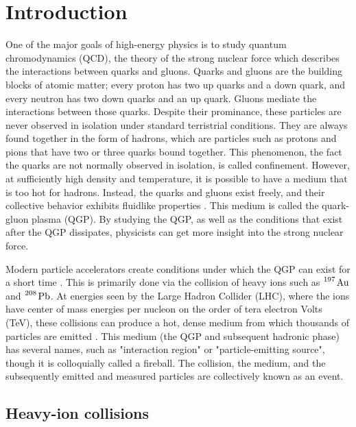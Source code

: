 \chapter{Introduction}
\label{sec:Introduction}


One of the major goals of high-energy physics is to study quantum chromodynamics (QCD), the theory of the strong nuclear force which describes the interactions between quarks and gluons.
Quarks and gluons are the building blocks of atomic matter; every proton has two up quarks and a down quark, and every neutron has two down quarks and an up quark. 
Gluons mediate the interactions between those quarks.
Despite their prominance, these particles are never observed in isolation under standard terristrial conditions.
They are always found together in the form of hadrons, which are particles such as protons and pions that have two or three quarks bound together.
This phenomenon, the fact the quarks are not normally observed in isolation, is called confinement.
However, at sufficiently high density and temperature, it is possible to have a medium that is too hot for hadrons.
Instead, the quarks and gluons exist freely, and their collective behavior exhibits fluidlike properties \cite{Heinz:2005zg}.
This medium is called the quark-gluon plasma (QGP).
By studying the QGP, as well as the conditions that exist after the QGP dissipates, physicists can get more insight into the strong nuclear force.

Modern particle accelerators create conditions under which the QGP can exist for a short time \cite{Heinz:2000bk}.
This is primarily done via the collision of heavy ions such as $\ce{^197 \mathrm{Au}}$ and $\ce{^208 \mathrm{Pb}}$.
At energies seen by the Large Hadron Collider (LHC), where the ions have center of mass energies per nucleon on the order of tera electron Volts (TeV), these collisions can produce a hot, dense medium from which thousands of particles are emitted \cite{Aamodt:2010cz}.
This medium (the QGP and subsequent hadronic phase) has several names, such as "interaction region" or "particle-emitting source", though it is colloquially called a fireball.
The collision, the medium, and the subsequently emitted and measured particles are collectively known as an event. 

\section{Heavy-ion collisions}
\label{sec:HeavyIonCollisions}

